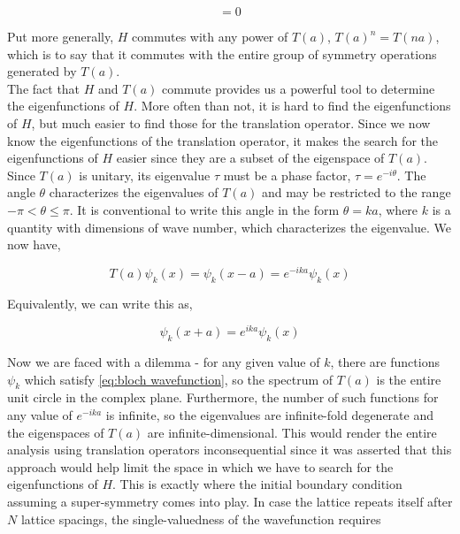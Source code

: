 \begin{equation}
    [T(a), H] = 0
\end{equation}

Put more generally, $H$ commutes with any power of $T(a)$, $T(a)^{n} = T(na)$, which is to say that it commutes with the entire group of symmetry operations generated by $T(a)$. \\

The fact that $H$ and $T(a)$ commute provides us a powerful tool to determine the eigenfunctions of $H$. More often than not, it is hard to find the eigenfunctions of $H$, but much easier to find those for the translation operator. Since we now know the eigenfunctions of the translation operator, it makes the search for the eigenfunctions of $H$ easier since they are a subset of the eigenspace of $T(a)$. \\

Since $T(a)$ is unitary, its eigenvalue $\tau$ must be a phase factor, $\tau = e^{-i\theta}$. The angle $\theta$ characterizes the eigenvalues of $T(a)$ and may be restricted to the range $-\pi < \theta \leq \pi$. It is conventional to write this angle in the form $\theta = ka$, where $k$ is a quantity with dimensions of wave number,
which characterizes the eigenvalue. We now have,

\begin{equation}
    T(a) \psi_{k}(x) = \psi_{k}(x-a) = e^{-ika}\psi_{k}(x)
\end{equation}

Equivalently, we can write this as,

\begin{equation}
\label{eq:bloch wavefunction}
    \psi_{k}(x+a) = e^{ika}\psi_{k}(x)
\end{equation}

Now we are faced with a dilemma - for any given value of $k$, there are functions $\psi_{k}$ which satisfy \ref{eq:bloch wavefunction}, so the spectrum of $T(a)$ is the entire unit circle in the complex plane. Furthermore, the number of such functions for any value of $e^{-ika}$ is infinite, so the eigenvalues are infinite-fold degenerate and the eigenspaces of $T(a)$ are infinite-dimensional. This would render the entire analysis using translation operators inconsequential since it was asserted that this approach would help limit the space in which we have to search for the eigenfunctions of $H$. This is exactly where the initial boundary condition assuming a super-symmetry comes into play. In case the lattice repeats itself after $N$ lattice spacings, the single-valuedness of the wavefunction requires

